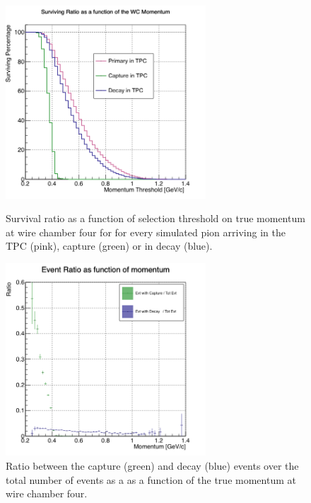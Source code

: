 \begin{figure}[h!]
\centering
\begin{minipage}[t]{0.45\textwidth}
\centering
\includegraphics[width=7.5cm]{Chapter-7/Images/CDThreshold.png}
\caption{Survival ratio as a function of selection threshold on true momentum at wire chamber four for for every simulated pion arriving in the TPC (pink), capture (green) or in decay (blue).   }
\label{fig:survRatio}
\end{minipage}\hfill
\begin{minipage}[t]{0.45\textwidth}
\centering
\includegraphics[width=7.5cm]{Chapter-7/Images/CDRatio.png}
\caption{Ratio between the capture (green) and decay (blue) events over the total number of events as a as a function of the true momentum at wire chamber four.}
\label{fig:evtRatio}
\end{minipage}
\end{figure}


